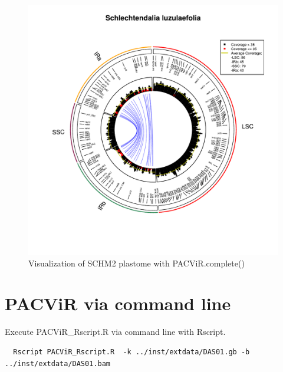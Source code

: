 \documentclass[letterpaper]{article}
\begin{document}
  \begin{figure}[H]
  \centering
    \includegraphics{SCHM2_WS250_TH35.pdf}
    \caption{Visualization of SCHM2 plastome with PACViR.complete()}
  \centering
  \end{figure}

\section{PACViR via command line}

  Execute PACViR\_Rscript.R via command line with Rscript.
  
\begin{footnotesize}
\begin{lstlisting}
  Rscript PACViR_Rscript.R  -k ../inst/extdata/DAS01.gb -b ../inst/extdata/DAS01.bam 
\end{lstlisting}
\end{footnotesize}
\end{document}
